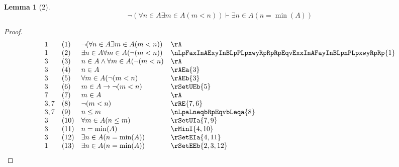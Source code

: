 \documentclass{book}
\theoremstyle{plain}
\newtheorem*{lemma}{Lemma}
\theoremstyle{remark}
\theoremstyle{definition}
\begin{document}
\begin{lemma}[2]
\[\neg(\forall n\in A\exists m\in A(m<n))\vdash \exists n\in A(n=\min(A))\]
\end{lemma}
\begin{proof}
	\[
	\begin{array}{llll}
        1  & (1) & \neg(\forall n\in A\exists m\in A(m<n)) & \rA \\
        1  & (2) & \exists n\in A \forall m\in A(\neg(m<n)) & \nLpFaxInAExyInBLpPLpxwyRpRpRpEqvExxInAFayInBLpnPLpxwyRpRp{1} \\
        3  & (3) & n\in A\land \forall m\in A(\neg(m<n) & \rA\\
        3  & (4) & n\in A & \rAEa{3}\\
        3  & (5) & \forall m\in A(\neg(m<n) & \rAEb{3}\\
        3  & (6) & m\in A\rightarrow \neg(m<n) & \rSetUEb{5}\\
        7  & (7) & m\in A & \rA\\
        3,7& (8) & \neg(m<n) & \rRE{7,6}\\
        3,7& (9) & n\leq m & \nLpaLneqbRpEqvbLeqa{8}\\
        3  & (10) & \forall m\in A(n\leq m) & \rSetUIa{7,9}\\
        3  & (11) & n=\min(A) & \rMinI{4,10}\\
        3  & (12) & \exists n\in A(n=\min(A)) & \rSetEIa{4,11}\\
        1  & (13) & \exists n\in A(n=\min(A)) & \rSetEEb{2,3,12}\\
	\end{array}
	\]
\end{proof}
\end{document}
